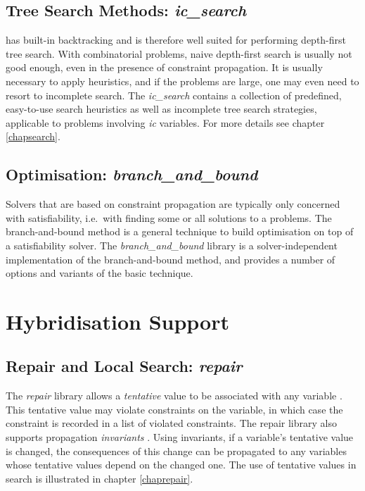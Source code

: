 \subsection{Tree Search Methods: {\em ic_search}}
\label{shortsecsearch}
\eclipse{} has built-in backtracking and is therefore well suited for
performing depth-first tree search.
With combinatorial problems, naive depth-first search is usually not
good enough, even in the presence of constraint propagation.
It is usually necessary to apply heuristics, and if the problems are
large, one may even need to resort to incomplete search.
The {\em ic_search} contains a collection of predefined, easy-to-use
search heuristics as well as incomplete tree search strategies, applicable
to problems involving {\em ic} variables.
For more details see chapter \ref{chapsearch}.


\subsection{Optimisation: {\em branch_and_bound}}
\label{shortsecbb}
Solvers that are based on constraint propagation are typically only
concerned with satisfiability, i.e.\ with finding some or all solutions
to a problems.
The branch-and-bound method is a general technique to build optimisation
on top of a satisfiability solver.
The \eclipse{} {\em branch_and_bound} library is a solver-independent
implementation of the branch-and-bound method, and provides a number
of options and variants of the basic technique.


\section{Hybridisation Support}
\subsection{Repair and Local Search: {\em repair}}
\label{shortsecrepair}
The {\em repair} library allows a {\em tentative} value to be
associated with any variable \cite{cp99wkshoptalk}.
This tentative value may violate constraints on the variable, in which
case the constraint is recorded in a list of violated constraints.
The repair library also supports propagation {\em invariants}
\cite{Localizer}.
Using invariants,  if a variable's tentative
value is changed, the consequences of this change can be propagated to
any variables whose tentative values depend on the changed one.
The use of tentative values in search is illustrated in chapter \ref{chaprepair}.
 

